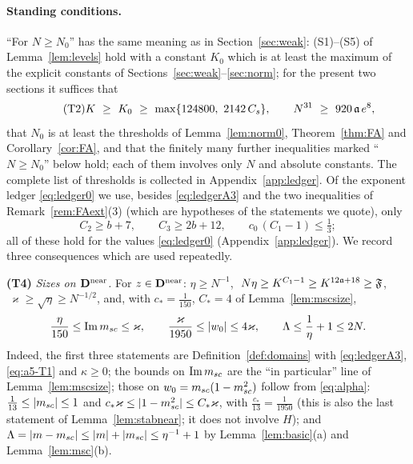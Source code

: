 \paragraph{Standing conditions.} ``For $N\ge N_0$'' has the same meaning as in Section~\ref{sec:weak}: (S1)--(S5) of Lemma~\ref{lem:levels} hold with a constant $K_0$ which is at least the maximum of the explicit constants of Sections~\ref{sec:weak}--\ref{sec:norm};
for the present two sections it suffices that
\begin{equation}\tag{T2}\label{eq:a5-T2}
 K\ \ge\ K_0\ \ge\ \max\{124800,\ 2142\,C_s\},\qquad N^{31}\ \ge\ 920\,\fa\,e^{8},
\end{equation}
that $N_0$ is at least the thresholds of Lemma~\ref{lem:norm0}, Theorem~\ref{thm:FA} and Corollary~\ref{cor:FA}, and that the finitely many further inequalities marked ``$N\ge N_0$'' below hold; each of them involves only $N$ and absolute constants.
The complete list of thresholds is collected in Appendix~\ref{app:ledger}. Of the exponent ledger \eqref{eq:ledger0} we use, besides \eqref{eq:ledgerA3} and the two inequalities of Remark~\ref{rem:FAext}(3) (which are hypotheses of the statements we quote), only
\begin{equation}\tag{T3}\label{eq:a5-T3}
 C_2\ge b+7,\qquad C_3\ge2b+12,\qquad c_0\,(C_1-1)\le\tfrac13 ;
\end{equation}
all of these hold for the values \eqref{eq:ledger0} (Appendix~\ref{app:ledger}). We record three consequences which are used repeatedly.

\smallskip\noindent\textbf{(T4)} \emph{Sizes on $\mathbf{D}^{\rm near}$.} For $z\in\mathbf{D}^{\rm near}$: $\eta\ge N^{-1}$, $\ N\eta\ge K^{C_1-1}\ge K^{12\mathfrak{a}+18}\ge\mathfrak F$, $\ \varkappa\ge\sqrt\eta\ge N^{-1/2}$, and, with $c_*=\frac1{150}$, $C_*=4$ of Lemma~\ref{lem:mscsize},
\[
 \frac{\eta}{150}\le\operatorname{Im}m_{sc}\le\varkappa,\qquad\frac{\varkappa}{1950}\le|w_0|\le4\varkappa,\qquad\Lambda\le\frac1\eta+1\le2N .
\]
Indeed, the first three statements are Definition~\ref{def:domains} with \eqref{eq:ledgerA3}, \eqref{eq:a5-T1} and $\kappa\ge0$; the bounds on $\operatorname{Im}m_{sc}$ are the ``in particular'' line of Lemma~\ref{lem:mscsize}; those on $w_0=m_{sc}(1-m_{sc}^2)$ follow from \eqref{eq:alpha}: $\frac1{13}\le|m_{sc}|\le1$ and $c_*\varkappa\le|1-m_{sc}^2|\le C_*\varkappa$, with $\frac{c_*}{13}=\frac1{1950}$ (this is also the last statement of Lemma~\ref{lem:stabnear}; it does not involve $H$);
and $\Lambda=|m-m_{sc}|\le|m|+|m_{sc}|\le\eta^{-1}+1$ by Lemma~\ref{lem:basic}(a) and Lemma~\ref{lem:msc}(b).

